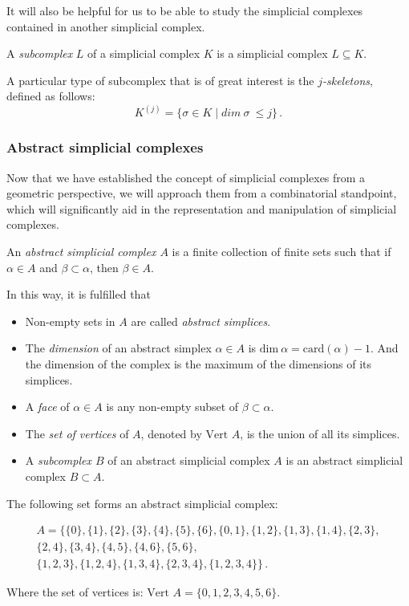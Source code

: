 \documentclass[../main.tex]{subfiles}
\begin{document}
It will also be helpful for us to be able to study the simplicial complexes contained in another simplicial complex.
\begin{definition}
A \emph{subcomplex} $L$ of a simplicial complex $K$ is a simplicial complex $L \subseteq K$.
\end{definition}

A particular type of subcomplex that is of great interest is the \emph{$j$-skeletons}, defined as follows: \[K^{(j)} = \{\sigma \in K \mid dim\ \sigma\ \leq j \}\,.\]

\subsubsection*{Abstract simplicial complexes}
Now that we have established the concept of simplicial complexes from a geometric perspective, we will approach them from a combinatorial standpoint, which will significantly aid in the representation and manipulation of simplicial complexes.

\begin{definition}
An \emph{abstract simplicial complex $A$} is a finite collection of finite sets such that if $\alpha \in A$ and $\beta \subset \alpha$, then $\beta \in A$.
\end{definition}
In this way, it is fulfilled that
\begin{itemize}
    \item Non-empty sets in $A$ are called \emph{abstract simplices}.
    \item The \emph{dimension} of an abstract simplex $\alpha \in A$ is $\text{dim}\ \alpha = \text{card}(\alpha) - 1$. And the dimension of the complex is the maximum of the dimensions of its simplices.
    \item A \emph{face} of $\alpha \in A$ is any non-empty subset of $\beta \subset \alpha$.
    \item The \emph{set of vertices} of $A$, denoted by $\text{Vert } A$, is the union of all its simplices.
    \item A \emph{subcomplex $B$} of an abstract simplicial complex $A$ is an abstract simplicial complex $B \subset A$.
\end{itemize}

\begin{exmp}
The following set forms an abstract simplicial complex:

\begin{gather*}
A = \{\{0\},\{1\},\{2\},\{3\},\{4\},\{5\},\{6\},\{0,1\},\{1,2\},\{1,3\},\{1,4\},\{2,3\},\\
\{2,4\},\{3,4\},\{4,5\},\{4,6\},\{5,6\},\\
\{1,2,3\},\{1,2,4\},\{1,3,4\},\{2,3,4\},\{1,2,3,4\}\}\,.
\end{gather*}

Where the set of vertices is: $\text{Vert }A = \{0, 1, 2, 3, 4, 5, 6\}$.
\end{exmp}
\end{document}
